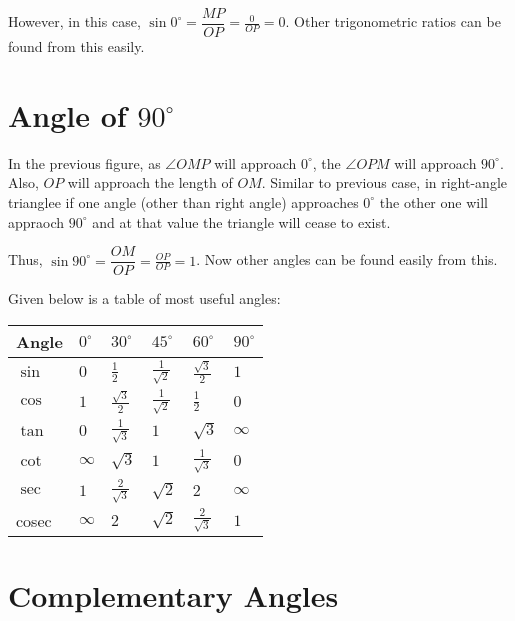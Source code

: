 However, in this case, $\sin0^\circ = \dfrac{MP}{OP} = \frac{0}{OP} = 0$. Other trigonometric ratios can be found from this easily.

\section{Angle of $90^\circ$}
In the previous figure, as $\angle OMP$ will approach $0^\circ$, the $\angle OPM$ will approach $90^\circ$. Also, $OP$ will
approach the length of $OM$. Similar to previous case, in right-angle trianglee if one angle (other than right angle) approaches
$0^\circ$ the other one will appraoch $90^\circ$ and at that value the triangle will cease to exist.

Thus, $\sin90^\circ = \dfrac{OM}{OP} = \frac{OP}{OP} = 1$. Now other angles can be found easily from this.

Given below is a table of most useful angles:

\begin{longtable}{|l|l|l|l|l|l|}
  \hline
  \textbf{Angle} & $0^\circ$ & $30^\circ$ & $45^\circ$ & $60^\circ$ & $90^\circ$\\
  \hline
  $\sin$ & $0$ & $\frac{1}{2}$ & $\frac{1}{\sqrt{2}}$ & $\frac{\sqrt{3}}{2}$ & $1$\\
  \hline
  $\cos$ & $1$ & $\frac{\sqrt{3}}{2}$ & $\frac{1}{\sqrt{2}}$ & $\frac{1}{2}$ & $0$\\
  \hline
  $\tan$ & $0$ & $\frac{1}{\sqrt{3}}$ & $1$ & $\sqrt{3}$ & $\infty$\\
  \hline
  $\cot$ & $\infty$ & $\sqrt{3}$ & $1$ & $\frac{1}{\sqrt{3}}$ & $0$\\
  \hline
  $\sec$ & $1$ & $\frac{2}{\sqrt{3}}$ & $\sqrt{2}$ & $2$ & $\infty$\\
  \hline
  cosec & $\infty$ & $2$ & $\sqrt{2}$ & $\frac{2}{\sqrt{3}}$ & $1$\\
  \hline
\end{longtable}
\section{Complementary Angles}
\begin{center}
\end{center}

